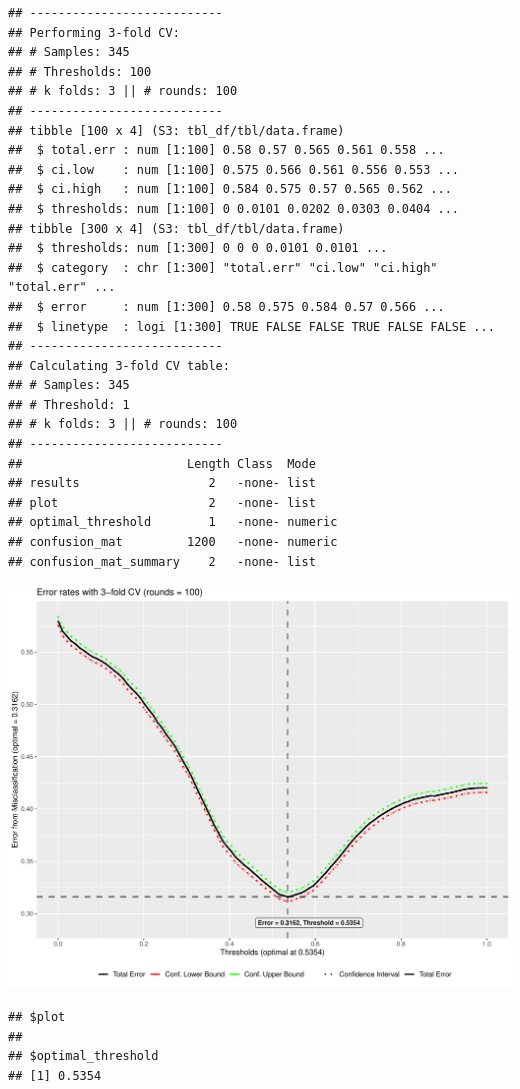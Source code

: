 \documentclass[
  11pt,
  a4paper,
]{scrartcl}
\begin{document}
\begin{verbatim}
## ---------------------------
## Performing 3-fold CV:
## # Samples: 345
## # Thresholds: 100
## # k folds: 3 || # rounds: 100
## ---------------------------
## tibble [100 x 4] (S3: tbl_df/tbl/data.frame)
##  $ total.err : num [1:100] 0.58 0.57 0.565 0.561 0.558 ...
##  $ ci.low    : num [1:100] 0.575 0.566 0.561 0.556 0.553 ...
##  $ ci.high   : num [1:100] 0.584 0.575 0.57 0.565 0.562 ...
##  $ thresholds: num [1:100] 0 0.0101 0.0202 0.0303 0.0404 ...
## tibble [300 x 4] (S3: tbl_df/tbl/data.frame)
##  $ thresholds: num [1:300] 0 0 0 0.0101 0.0101 ...
##  $ category  : chr [1:300] "total.err" "ci.low" "ci.high" "total.err" ...
##  $ error     : num [1:300] 0.58 0.575 0.584 0.57 0.566 ...
##  $ linetype  : logi [1:300] TRUE FALSE FALSE TRUE FALSE FALSE ...
## ---------------------------
## Calculating 3-fold CV table:
## # Samples: 345
## # Threshold: 1
## # k folds: 3 || # rounds: 100
## ---------------------------
##                       Length Class  Mode   
## results                  2   -none- list   
## plot                     2   -none- list   
## optimal_threshold        1   -none- numeric
## confusion_mat         1200   -none- numeric
## confusion_mat_summary    2   -none- list
\end{verbatim}

\begin{center}\includegraphics{figure/analysis-glm-3cv-plot-1} \end{center}

\begin{verbatim}
## $plot
## 
## $optimal_threshold
## [1] 0.5354
\end{verbatim}
\end{document}
